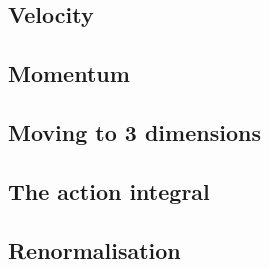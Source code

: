 


\subsection{Velocity}

\subsection{Momentum}

\subsection{Moving to 3 dimensions}

\subsection{The action integral}

\subsection{Renormalisation}



